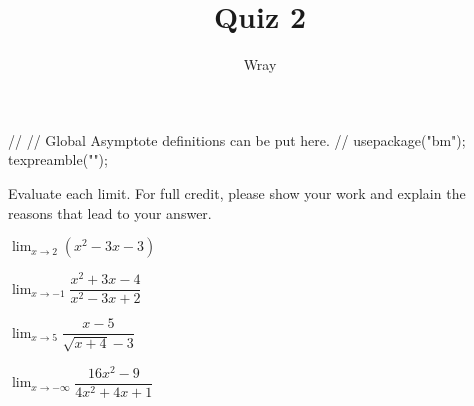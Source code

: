 \documentclass[addpoints, 12pt]{exam}
\title{Quiz 2}
\author{Wray}
\begin{document}
\begin{asydef}
//
// Global Asymptote definitions can be put here.
//
usepackage("bm");
texpreamble("\def\V#1{\bm{#1}}");
\end{asydef}



\bigskip
{}
             
\bigskip
\bigskip
\smallskip
Evaluate each limit.  For full credit, please show your work and explain the reasons that lead to your answer.
\begin{questions}

\question[5]
$\displaystyle \lim_{x \to 2} \left( x^2 - 3x - 3 \right)$

\question[5]
$\displaystyle \lim_{x \to -1} \dfrac{x^2 + 3x  - 4}{x^2 - 3x + 2}$

\clearpage

\question[5]
$\displaystyle \lim_{x \to 5} \dfrac{x - 5}{\sqrt{x + 4} - 3}$

\question[5]
$\displaystyle \lim_{x \to - \infty} \dfrac{16x^2 - 9}{4x^2 + 4x + 1}$


\end{questions}
\end{document}
